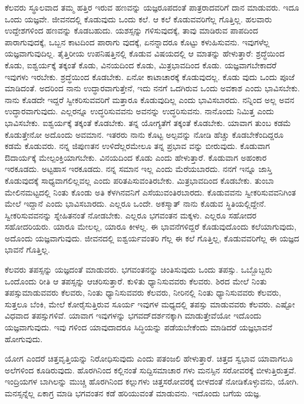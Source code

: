 ಕೆಲವರು ಸ್ಥೂಲವಾದ ತಮ್ಮ ಹತ್ತಿರ ಇರುವ ಹಣವನ್ನು ಯಜ್ಞರೂಪದಂತೆ ಪಾತ್ರರಾದವರಿಗೆ ದಾನ ಮಾಡುವರು. ಇದೂ ಒಂದು ಯಜ್ಞವೇ. ಜೀವನದಲ್ಲಿ ಕೊಡುವುದು ಒಂದು ಕಲೆ. ಆ ಕಲೆ ಕೊಡುವವರಿಗೆಲ್ಲ ಗೊತ್ತಿಲ್ಲ. ಹಲವಾರು ಉದ್ದೇಶಗಳಿಂದ ಹಣವನ್ನು ಕೊಡಬಹುದು. ಯಶಸ್ಸನ್ನು ಗಳಿಸುವುದಕ್ಕೆ, ತಾವು ಮಾಡಿರುವ ಪಾಪದಿಂದ ಪಾರಾಗುವುದಕ್ಕೆ, ಒಬ್ಬನ ಕಾಟದಿಂದ ಪಾರಾಗು ವುದಕ್ಕೆ, ಏನನ್ನಾದರೂ ಕೊಟ್ಟು ಕಳುಹಿಸುವನು. ಇವುಗಳೆಲ್ಲ ಯಜ್ಞವಾಗುವುದಿಲ್ಲ. ತೈತ್ತಿರೀಯ ಉಪನಿಷತ್ತಿನಲ್ಲಿ ಕೊಡುವ ವಿಷಯದಲ್ಲಿ ಆ ಮಾತನ್ನು ಹೇಳುತ್ತಾರೆ: ಶ್ರದ್ಧೆಯಿಂದ ಕೊಡು, ಐಶ್ವರ್ಯಕ್ಕೆ ತಕ್ಕಂತೆ ಕೊಡು, ವಿನಯದಿಂದ ಕೊಡು, ಮಿತ್ರಭಾವದಿಂದ ಕೊಡು. ಯಜ್ಞವಾಗಬೇಕಾದರೆ ಇವುಗಳು ಇರಬೇಕು. ಶ್ರದ್ಧೆಯಿಂದ ಕೊಡಬೇಕು. ಏನೋ ಕಾಟಾಚಾರಕ್ಕೆ ಕೊಡುವುದಲ್ಲ. ಕೊಡು ವುದು ಒಂದು ಪೂಜೆ ಮಾಡಿದಂತೆ. ಅದರಿಂದ ನಾನು ಉದ್ಧಾರವಾಗುತ್ತೇನೆ, ಇದು ನನಗೆ ಒದಗಿರುವ ಒಂದು ಅವಕಾಶ ಎಂದು ಭಾವಿಸಬೇಕು. ನಾನು ಕೊಡದೇ ಇದ್ದರೆ ಸ್ವೀಕರಿಸುವವರಿಗೆ ಮತ್ತಾರೂ ಕೊಡುವುದಿಲ್ಲ ಎಂದು ಭಾವಿಸಬಾರದು. ನನ್ನಿಂದ ಅಲ್ಲ ಅವನ ಉದ್ಧಾರವಾಗುವುದು. ಎಲ್ಲರನ್ನೂ ಉದ್ಧರಿಸುವವನು ಅವನನ್ನು ಉದ್ಧರಿಸುವನು. ನಾನೊಂದು ನಿಮಿತ್ತ ಎಂದು ಭಾವಿಸಬೇಕು. ಐಶ್ವರ್ಯಕ್ಕೆ ತಕ್ಕಂತೆ ಕೊಡಬೇಕು. ತನ್ನ ಯೋಗ್ಯತೆಗೆ ತಕ್ಕಂತೆ ಕೊಡಬೇಕು. ಯಾವಾಗ ತುಂಬ ಕಡಮೆ ಕೊಡುತ್ತೇನೋ ಅದೊಂದು ಅವಮಾನ. ಇತರರು ನಾನು ಕೊಟ್ಟ ಅಲ್ಪವನ್ನು ನೋಡಿ ಹೆಚ್ಚು ಕೊಡಬೇಕೆಂದಿದ್ದರೂ ಕಡಮೆ ಕೊಡುವರು. ನನ್ನ ಜಿಪುಣತನ ಉಳಿದೆಲ್ಲರಮೇಲೂ ತನ್ನ ಪ್ರಭಾವ ವನ್ನು ಬೀರುವುದು. ಕೊಡುವಾಗ ಔದಾರ್ಯಕ್ಕೆ ಮೇಲ್ಪಂಕ್ತಿಯಾಗಬೇಕು. ವಿನಯದಿಂದ ಕೊಡು ಎಂದು ಹೇಳುತ್ತಾರೆ. ಕೊಡುವಾಗ ಅಹಂಕಾರ ಇರಕೂಡದು. ಅಟ್ಟಹಾಸ ಇರಕೂಡದು. ನನ್ನ ಸಮಾನ ಇಲ್ಲ ಎಂದು ಮೆರೆಯಬಾರದು. ನನಗೆ ಇನ್ನೂ ಜಾಸ್ತಿ ಕೊಡುವುದಕ್ಕೆ ಸಾಧ್ಯವಾಗಲಿಲ್ಲವಲ್ಲ ಎಂದು ಪರಿತಪಿಸುವಂತಿರಬೇಕು. ಮಿತ್ರಭಾವದಿಂದ ಕೊಡಬೇಕು. ತುಂಬಾ ಮೇಲಿನಮಟ್ಟದಲ್ಲಿ ನಿಂತು ಕೊಂಡು ಅತಿ ಕೆಳಗಿನವನಿಗೆ ಎಸೆಯುವಂತಿರಬಾರದು. ಕೊಡುವವನು ಸ್ವೀಕರಿಸುವವನಿಗಿಂತ ಮೇಲೆ ಇದ್ದಾನೆ ಎಂದು ಭಾವಿಸಬಾರದು. ಎಲ್ಲರೂ ಒಂದೇ. ಅಕಸ್ಮಾತ್ ನಾನು ಕೊಡುವ ಸ್ಥಿತಿಯಲ್ಲಿದ್ದೇನೆ. ಸ್ವೀಕರಿಸುವವನನ್ನು ಸ್ನೇಹಿತನಂತೆ ನೋಡಬೇಕು. ಎಲ್ಲರೂ ಭಗವಂತನ ಮಕ್ಕಳು. ಎಲ್ಲರೂ ಸಹೋದರ ಸಹೋದರಿಯರು. ಯಾರೂ ಮೇಲಲ್ಲ, ಯಾರೂ ಕೀಳಲ್ಲ. ಈ ಭಾವನೆಗಳಿದ್ದರೆ ಕೊಡುವುದೊಂದು ಕಲೆಯಾಗುವುದು, ಅದೊಂದು ಯಜ್ಞವಾಗುವುದು. ಜೀವನದಲ್ಲಿ ಐಶ್ವರ್ಯವಂತರಿ ಗೆಲ್ಲ ಈ ಕಲೆ ಗೊತ್ತಿಲ್ಲ, ಕೊಡುವವರಿಗೆಲ್ಲ ಈ ಯಜ್ಞದ ಭಾವನೆ ಗೊತ್ತಿಲ್ಲ.

ಕೆಲವರು ತಪಸ್ಸನ್ನು ಯಜ್ಞದಂತೆ ಮಾಡುವರು. ಭಗವಂತನನ್ನು ಚಿಂತಿಸುವುದು ಒಂದು ತಪಸ್ಸು. ಒಬ್ಬೊಬ್ಬರು ಒಂದೊಂದು ರೀತಿ ಆ ತಪಸ್ಸನ್ನು ಆಚರಿಸುತ್ತಾರೆ. ಕುಳಿತು ಧ್ಯಾನಿಸುವವರು ಕೆಲವರು. ಶಿರದ ಮೇಲೆ ನಿಂತು ತಪಸ್ಸುಮಾಡುವವರು ಕೆಲವರು, ನಿಂತು ಧ್ಯಾನಿಸುವವರು ಕೆಲವರು, ನೀರಿನಲ್ಲಿ ನಿಂತು ಧ್ಯಾನಿಸುವವರು ಕೆಲವರು, ಸುತ್ತಲೂ ಬೆಂಕಿ, ಮೇಲೆ ಕೋರೈಸುತ್ತಿರುವ ಸೂರ್ಯ ಇವುಗಳ ಮಧ್ಯದಲ್ಲಿ ತಪಸ್ಸು ಮಾಡುವವರು ಕೆಲವರು. ಎಷ್ಟೋ ವಿಧವಾದ ತಪಸ್ಸುಗಳಿವೆ. ಯಾವಾಗ ಇವುಗಳನ್ನು ಭಗವದ್​ದರ್ಶನಕ್ಕಾಗಿ ಮಾಡುತ್ತೇವೆಯೋ ಇದೊಂದು ಯಜ್ಞವಾಗುವುದು. ಇವು ಗಳಿಂದ ಯಾವುದಾದರೂ ಸಿದ್ಧಿಯನ್ನು ಪಡೆಯಬೇಕೆಂದು ಮಾಡಿದರೆ ಯಜ್ಞಭಾವನೆ ಹೋಗುವುದು.

ಯೋಗ ಎಂದರೆ ಚಿತ್ತವೃತ್ತಿಯನ್ನು ನಿರೋಧಿಸುವುದು ಎಂದು ಪತಂಜಲಿ ಹೇಳುತ್ತಾರೆ. ಚಿತ್ತದ ಸ್ವಭಾವ ಯಾವಾಗಲೂ ಅಲೆಗಳಿಂದ ಕೂಡಿರುವುದು. ಹೊರಗಿನಿಂದ ಕಲ್ಲಿನಂತೆ ಸುದ್ದಿಸಮಾಚಾರ ಗಳು ಮನಸ್ಸಿನ ಸರೋವರಕ್ಕೆ ಬೀಳುತ್ತಿರುತ್ತವೆ. ಇಂದ್ರಿಯಗಳ ಬಾಗಿಲನ್ನು ಮುಚ್ಚಿ ಹೊರಗಿನಿಂದ ಕಲ್ಲುಗಳು ಚಿತ್ತಸರೋವರಕ್ಕೆ ಬೀಳದಂತೆ ನೋಡಿಕೊಳ್ಳುವನು, ಯೋಗಿ. ಮನಸ್ಸನ್ನೆಲ್ಲ ಏಕಾಗ್ರ ಮಾಡಿ ಭಗವಂತನ ಕಡೆ ಹರಿಯುವಂತೆ ಮಾಡುವನು. ಇದೊಂದು ಬಗೆಯ ಯಜ್ಞ.

